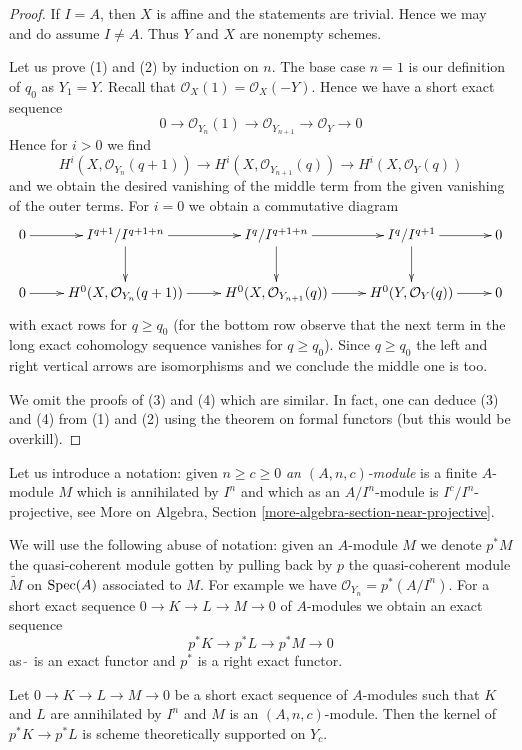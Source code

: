 \begin{proof}
If $I = A$, then $X$ is affine and the statements are trivial.
Hence we may and do assume $I \not = A$.
Thus $Y$ and $X$ are nonempty schemes.

\medskip\noindent
Let us prove (1) and (2) by induction on $n$. The base case $n = 1$
is our definition of $q_0$ as $Y_1 = Y$.
Recall that $\mathcal{O}_X(1) = \mathcal{O}_X(-Y)$.
Hence we have a short exact sequence
$$
0 \to \mathcal{O}_{Y_n}(1) \to \mathcal{O}_{Y_{n + 1}} \to \mathcal{O}_Y \to 0
$$
Hence for $i > 0$ we find
$$
H^i(X, \mathcal{O}_{Y_n}(q + 1)) \to
H^i(X, \mathcal{O}_{Y_{n + 1}}(q)) \to
H^i(X, \mathcal{O}_{Y}(q))
$$
and we obtain the desired vanishing of the middle term from the given
vanishing of the outer terms. For $i = 0$ we obtain a commutative diagram
$$
\xymatrix{
0 \ar[r] &
I^{q + 1}/I^{q + 1 + n} \ar[d] \ar[r] &
I^q/I^{q + 1 + n} \ar[d] \ar[r] &
I^q/I^{q + 1} \ar[d] \ar[r] &
0 \\
0 \ar[r] &
H^0(X, \mathcal{O}_{Y_n}(q + 1)) \ar[r] &
H^0(X, \mathcal{O}_{Y_{n + 1}}(q)) \ar[r] &
H^0(Y, \mathcal{O}_Y(q)) \ar[r] &
0
}
$$
with exact rows for $q \geq q_0$ (for the bottom row observe that
the next term in the long exact cohomology sequence vanishes for
$q \geq q_0$). Since $q \geq q_0$ the left and right vertical arrows
are isomorphisms and we conclude the middle one is too.

\medskip\noindent
We omit the proofs of (3) and (4) which are similar.
In fact, one can deduce (3) and (4) from (1) and (2)
using the theorem on formal functors (but this would be
overkill).
\end{proof}

\noindent
Let us introduce a notation: given $n \geq c \geq 0$
{\it an $(A, n, c)$-module}
is a finite $A$-module $M$ which is annihilated by $I^n$
and which as an $A/I^n$-module is $I^c/I^n$-projective, see
More on Algebra, Section \ref{more-algebra-section-near-projective}.

\medskip\noindent
We will use the following abuse of notation: given an $A$-module $M$
we denote $p^*M$ the quasi-coherent module gotten by pulling back by $p$
the quasi-coherent module $\widetilde{M}$ on $\mathop{\mathrm{Spec}}(A)$ associated to $M$.
For example we have $\mathcal{O}_{Y_n} = p^*(A/I^n)$.
For a short exact sequence $0 \to K \to L \to M \to 0$ of $A$-modules
we obtain an exact sequence
$$
p^*K \to p^*L \to p^*M \to 0
$$
as $\widetilde{\ }$ is an exact functor and $p^*$ is a right exact functor.

\begin{lemma}
\label{lemma-almost-exactness}
Let $0 \to K \to L \to M \to 0$ be a short exact sequence of $A$-modules
such that $K$ and $L$ are annihilated by $I^n$ and $M$ is an
$(A, n, c)$-module. Then the kernel of $p^*K \to p^*L$
is scheme theoretically supported on $Y_c$.
\end{lemma}


